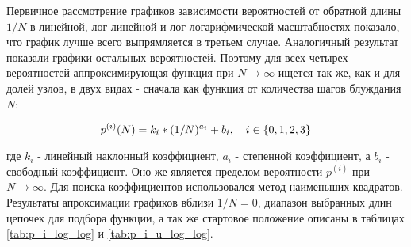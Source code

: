 Первичное рассмотрение графиков зависимости вероятностей от обратной длины $1/N$ в линейной, лог-линейной и лог-логарифмической масштабностях показало, что график лучше всего выпрямляется в третьем случае. 
Аналогичный результат показали графики остальных вероятностей.
Поэтому для всех четырех вероятностей аппроксимирующая функция при $N \to \infty$ ищется так же, как и для долей узлов, в двух видах - сначала как функция от количества шагов блуждания $N$:

\begin{equation}
p^{(i)}(N) = k_i * (1/N)^{a_i} + b_i, \ \ \ i \in \{ 0,1,2,3\} \\
\end{equation}

где $k_i$ - линейный наклонный коэффициент, $a_i$ - степенной коэффициент, а $b_i$ - свободный коэффициент. 
Оно же является пределом вероятности $p^{(i)}$ при $N \to \infty$.
Для поиска коэффициентов использовался метод наименьших квадратов.
Результаты апроксимации графиков вблизи $1/N = 0$, диапазон выбранных длин цепочек для подбора функции,
а так же стартовое положение описаны в таблицах \ref{tab:p_i_log_log} и \ref{tab:p_i_u_log_log}. 

